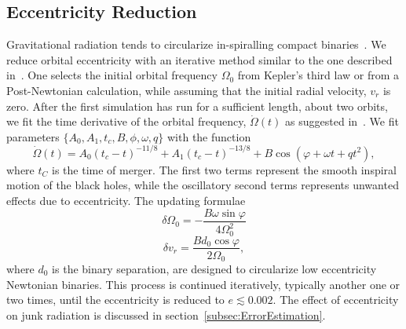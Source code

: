 \subsection{Eccentricity Reduction}
Gravitational radiation tends to circularize in-spiralling compact
binaries~. We reduce orbital
eccentricity with an iterative method similar to the one described in~. One selects the initial orbital
frequency $\Omega_0$ from Kepler's third law or from a Post-Newtonian
calculation, while assuming that the initial radial velocity, $v_r$ is
zero. After the first simulation has run for a sufficient length, about two orbits, we fit the time derivative of
the orbital frequency, $\dot{\Omega}(t)$ as suggested
in~\cite{Buonanno:2010yk}.  We fit parameters $\{A_0, A_1, t_c, B, \phi, \omega, q\}$ with the function
\begin{equation}
\dot{\Omega}(t)=A_0\left(t_c-t\right)^{-11/8}+A_1\left(t_c-t\right)^{-13/8}
+B\cos\left(\varphi + \omega
  t+qt^2\right),
\end{equation}
where $t_C$ is the time of merger. The first two terms represent the
smooth inspiral motion of the black holes, while the oscillatory
second terms represents unwanted effects due to eccentricity. The
updating formulae
\begin{equation}
\delta\Omega_0=-\frac{B\omega\sin{\varphi}}{4\Omega_0^2}
\end{equation}
\begin{equation}
\delta v_r = \frac{B d_0\cos{\varphi}}{2\Omega_0},
\end{equation}
where $d_0$ is the binary separation, are designed to circularize low eccentricity Newtonian binaries. This
process is continued iteratively, typically another one or two times,
until the eccentricity is reduced to $e\lesssim 0.002$. The effect of
eccentricity on junk radiation is discussed in section~\ref{subsec:ErrorEstimation}.

%

